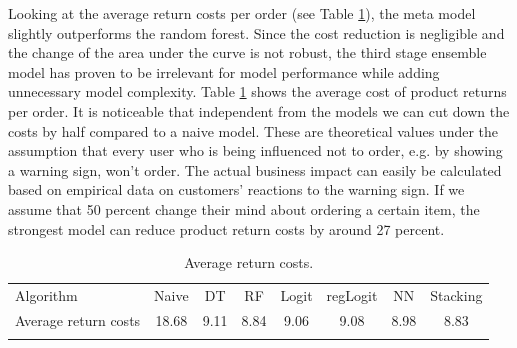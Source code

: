 \documentclass[12pt]{article}
\begin{document}
Looking at the average return costs per order (see Table \ref{table:Average return costs}), the meta model slightly outperforms the random forest. Since the cost reduction is negligible and the change of the area under the curve is not robust, the third stage ensemble model has proven to be irrelevant for model performance while adding unnecessary model complexity. 
Table \ref{table:Average return costs} shows the average cost of product returns per order. It is noticeable that independent from the models we can cut down the costs by half compared to a naive model. These are theoretical values under the assumption that every user who is being influenced not to order, e.g. by showing a warning sign, won’t order. The actual business impact can easily be calculated based on empirical data on customers’ reactions to the warning sign. If we assume that 50 percent change their mind about ordering a certain item, the strongest model can reduce product return costs by around 27 percent. 
\begin{table}[H]
\begin{center}
\begin{tabular}{l|ccccccc} 
\hline\hline
 Algorithm & Naive    &    DT   &     RF   & Logit   &  regLogit  & NN	  &   Stacking \\
\noalign{\smallskip}
\hline
\noalign{\smallskip}
Average return costs & 18.68 & 9.11 & 8.84 & 9.06  & 9.08 & 8.98 & 8.83 \\
\noalign{\smallskip}
\hline\hline
\end{tabular}
\caption{Average return costs.}
\label{table:Average return costs}
\end{center}
\end{table}
\end{document}
